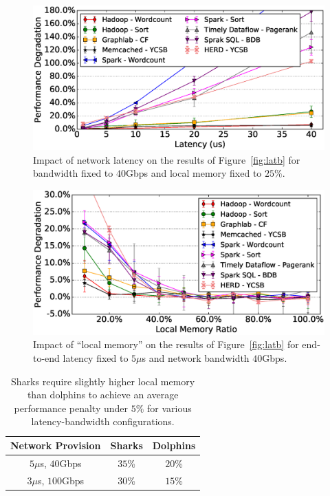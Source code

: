 \begin{figure}[t]
  \centering
    \includegraphics[width=\columnwidth]{img/fix_bw_vary_latency.eps} 
  \caption{\small{Impact of network latency on the results of Figure~\ref{fig:latb} for bandwidth fixed to $40$Gbps and local memory fixed to $25\%$. }} %
  \label{fig:impl}
\end{figure}
%
%
\begin{figure}[t]
  \centering
    \includegraphics[width=\columnwidth]{img/vary_remote_mem.eps} 
  \caption{\small{Impact of ``local memory'' on the results of Figure~\ref{fig:latb} for end-to-end latency fixed to $5\mu$s and network bandwidth $40$Gbps.}} %
  \label{fig:impb}
\end{figure}
\vspace{1em}
%
%
\vspace{1em}
\begin{table}[t]
    \centering
    \small
    \begin{tabular}{c|c|c}
    \textbf{Network Provision} & \textbf{Sharks} & \textbf{Dolphins}\\
    \hline\hline
    $5\mu$s, $40$Gbps & $35$\% & $20$\%\\\hline
    $3\mu$s, $100$Gbps & $30$\% & $15$\%\\\hline\hline
    \end{tabular}
    \caption{Sharks require slightly higher local memory than dolphins to achieve an average performance penalty under $5\%$ for various latency-bandwidth configurations.}
    \label{tab:rmem}
\end{table}
%


